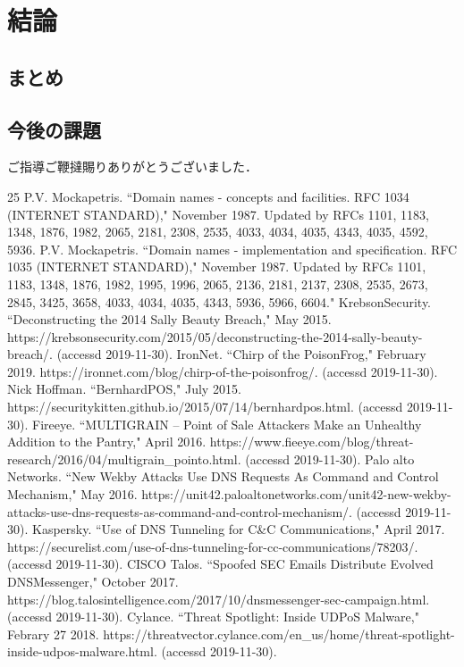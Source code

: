 \documentclass[12pt]{jarticle} %
\begin{document}
\newpage
\section{結論}
\subsection{まとめ}
\subsection{今後の課題}


\newpage
\acknowledgements
ご指導ご鞭撻賜りありがとうございました．




\newpage
%
\begin{thebibliography} {25}\small
  P.V. Mockapetris. ``Domain names - concepts and facilities. RFC 1034 (INTERNET STANDARD)," November 1987. Updated by RFCs 1101, 1183, 1348, 1876, 1982, 2065, 2181, 2308, 2535, 4033, 4034, 4035, 4343, 4035, 4592, 5936.
  P.V. Mockapetris. ``Domain names - implementation and specification. RFC 1035 (INTERNET STANDARD)," November 1987. Updated by RFCs 1101, 1183, 1348, 1876, 1982, 1995, 1996, 2065, 2136, 2181, 2137, 2308, 2535, 2673, 2845, 3425, 3658, 4033, 4034, 4035, 4343, 5936, 5966, 6604."
  KrebsonSecurity. ``Deconstructing the 2014 Sally Beauty Breach," May 2015. https://krebsonsecurity.com/2015/05/deconstructing-the-2014-sally-beauty-breach/. (accessd 2019-11-30).
  IronNet. ``Chirp of the PoisonFrog," February 2019. https://ironnet.com/blog/chirp-of-the-poisonfrog/. (accessd 2019-11-30).
  Nick Hoffman. ``BernhardPOS," July 2015. https://securitykitten.github.io/2015/07/14/bernhardpos.html. (accessd 2019-11-30).
  Fireeye. ``MULTIGRAIN – Point of Sale Attackers Make an Unhealthy Addition to the Pantry," April 2016. https://www.fieeye.com/blog/threat-research/2016/04/multigrain\_pointo.html. (accessd 2019-11-30).
  Palo alto Networks. ``New Wekby Attacks Use DNS Requests As Command and Control Mechanism," May 2016. https://unit42.paloaltonetworks.com/unit42-new-wekby-attacks-use-dns-requests-as-command-and-control-mechanism/. (accessd 2019-11-30).
  Kaspersky. ``Use of DNS Tunneling for C\&C Communications," April 2017. https://securelist.com/use-of-dns-tunneling-for-cc-communications/78203/. (accessd 2019-11-30).
  CISCO Talos. ``Spoofed SEC Emails Distribute Evolved DNSMessenger," October 2017. https://blog.talosintelligence.com/2017/10/dnsmessenger-sec-campaign.html. (accessd 2019-11-30).
  Cylance. ``Threat Spotlight: Inside UDPoS Malware," Febrary 27 2018. https://threatvector.cylance.com/en\_us/home/threat-spotlight-inside-udpos-malware.html. (accessd 2019-11-30).
\end{thebibliography}

\end{document}

